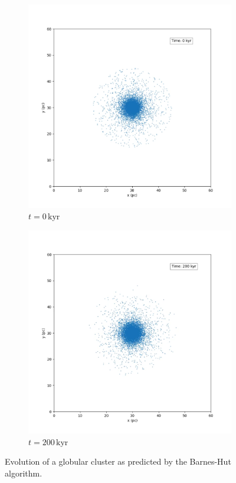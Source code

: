 \begin{figure}[htp]
    \centering
    \begin{subfigure}[b]{0.45\textwidth}
        \centering
        \includegraphics[width=\textwidth]{chapters/results/img/bh-cluster/0kyr.png}
        \caption{$t=0\,\text{kyr}$}
        \label{fig:cluster-evolution-bh-cluster-sub1}
    \end{subfigure}
    \hfill
    \begin{subfigure}[b]{0.45\textwidth}
        \centering
        \includegraphics[width=\textwidth]{chapters/results/img/bh-cluster/200kyr.png}
        \caption{$t=200\,\text{kyr}$}
        \label{fig:cluster-evolution-bh-cluster-sub2}
    \end{subfigure}
    \caption{Evolution of a globular cluster as predicted by the Barnes-Hut algorithm.}
    \label{fig:cluster-evolution-bh}
\end{figure}
